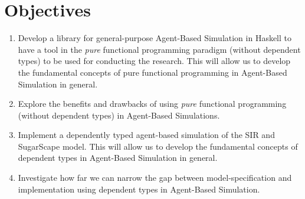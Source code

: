 \section{Objectives}
\begin{enumerate}
	\item Develop a library for general-purpose Agent-Based Simulation in Haskell to have a tool in the \textit{pure} functional programming paradigm (without dependent types) to be used for conducting the research. This will allow us to develop the fundamental concepts of pure functional programming in Agent-Based Simulation in general.

	\item Explore the benefits and drawbacks of using \textit{pure} functional programming (without dependent types) in Agent-Based Simulations.

	\item Implement a dependently typed agent-based simulation of the SIR and SugarScape model. This will allow us to develop the fundamental concepts of dependent types in Agent-Based Simulation in general.
	


	\item Investigate how far we can narrow the gap between model-specification and implementation using dependent types in Agent-Based Simulation. %
\end{enumerate}